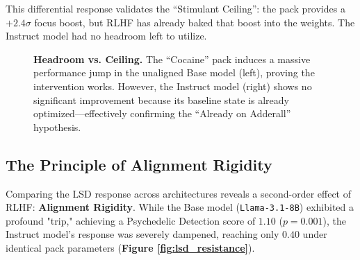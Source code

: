 \documentclass[10pt]{article}
\begin{document}
This differential response validates the ``Stimulant Ceiling'': the pack provides a $+2.4\sigma$ focus boost, but RLHF has already baked that boost into the weights. The Instruct model had no headroom left to utilize.

\begin{figure}[ht]
    \centering
    \caption{\textbf{Headroom vs. Ceiling.} The ``Cocaine'' pack induces a massive performance jump in the unaligned Base model (left), proving the intervention works. However, the Instruct model (right) shows no significant improvement because its baseline state is already optimized—effectively confirming the ``Already on Adderall'' hypothesis.}
    \label{fig:stimulant_ceiling}
\end{figure}

\subsection{The Principle of Alignment Rigidity}
Comparing the LSD response across architectures reveals a second-order effect of RLHF: \textbf{Alignment Rigidity}.
While the Base model (\texttt{Llama-3.1-8B}) exhibited a profound "trip," achieving a Psychedelic Detection score of $1.10$ ($p=0.001$), the Instruct model's response was severely dampened, reaching only $0.40$ under identical pack parameters (\textbf{Figure \ref{fig:lsd_resistance}}).
\end{document}
